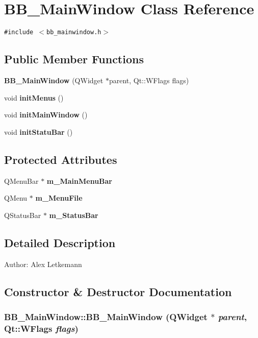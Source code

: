 \section{BB\_\-Main\-Window Class Reference}
\label{classBB__MainWindow}
{\tt \#include $<$bb\_\-mainwindow.h$>$}

\subsection*{Public Member Functions}
\begin{CompactItemize}
\item 
{\bf BB\_\-Main\-Window} (QWidget $\ast$parent, Qt::WFlags flags)
\item 
void {\bf init\-Menus} ()
\item 
void {\bf init\-Main\-Window} ()
\item 
void {\bf init\-Statu\-Bar} ()
\end{CompactItemize}
\subsection*{Protected Attributes}
\begin{CompactItemize}
\item 
QMenu\-Bar $\ast$ {\bf m\_\-Main\-Menu\-Bar}
\item 
QMenu $\ast$ {\bf m\_\-Menu\-File}
\item 
QStatus\-Bar $\ast$ {\bf m\_\-Status\-Bar}
\end{CompactItemize}


\subsection{Detailed Description}
\begin{Desc}
\item[Author:]Alex Letkemann \end{Desc}




\subsection{Constructor \& Destructor Documentation}
\subsubsection{\setlength{\rightskip}{0pt plus 5cm}BB\_\-Main\-Window::BB\_\-Main\-Window (QWidget $\ast$ {\em parent}, Qt::WFlags {\em flags})}\label{classBB__MainWindow_a1}


